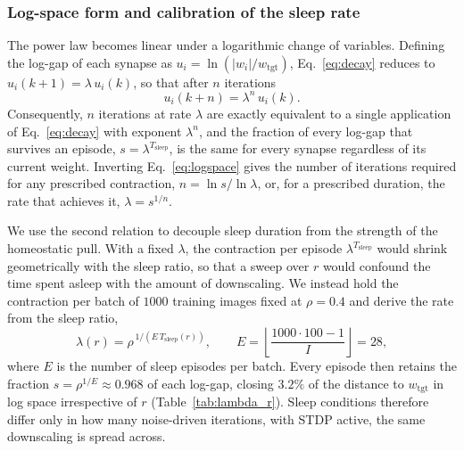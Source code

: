 \subsubsection{Log-space form and calibration of the sleep rate}

The power law becomes linear under a logarithmic change of variables. Defining the log-gap of each synapse as $u_i = \ln\!\left(|w_i| / w_{\mathrm{tgt}}\right)$, Eq.~\eqref{eq:decay} reduces to $u_i(k+1) = \lambda\, u_i(k)$, so that after $n$ iterations
\begin{equation}
u_i(k+n) = \lambda^{n}\, u_i(k).
\label{eq:logspace}
\end{equation}
Consequently, $n$ iterations at rate $\lambda$ are exactly equivalent to a single application of Eq.~\eqref{eq:decay} with exponent $\lambda^{n}$, and the fraction of every log-gap that survives an episode, $s = \lambda^{T_{\mathrm{sleep}}}$, is the same for every synapse regardless of its current weight. Inverting Eq.~\eqref{eq:logspace} gives the number of iterations required for any prescribed contraction, $n = \ln s / \ln \lambda$, or, for a prescribed duration, the rate that achieves it, $\lambda = s^{1/n}$.

We use the second relation to decouple sleep duration from the strength of the homeostatic pull. With a fixed $\lambda$, the contraction per episode $\lambda^{T_{\mathrm{sleep}}}$ would shrink geometrically with the sleep ratio, so that a sweep over $r$ would confound the time spent asleep with the amount of downscaling. We instead hold the contraction per batch of $1000$ training images fixed at $\rho = 0.4$ and derive the rate from the sleep ratio,
\begin{equation}
\lambda(r) = \rho^{\,1 / \left(E \, T_{\mathrm{sleep}}(r)\right)}, \qquad E = \left\lfloor \frac{1000 \cdot 100 - 1}{I} \right\rfloor = 28,
\label{eq:lambda_r}
\end{equation}
where $E$ is the number of sleep episodes per batch. Every episode then retains the fraction $s = \rho^{1/E} \approx 0.968$ of each log-gap, closing $3.2\%$ of the distance to $w_{\mathrm{tgt}}$ in log space irrespective of $r$ (Table~\ref{tab:lambda_r}). Sleep conditions therefore differ only in how many noise-driven iterations, with STDP active, the same downscaling is spread across.

